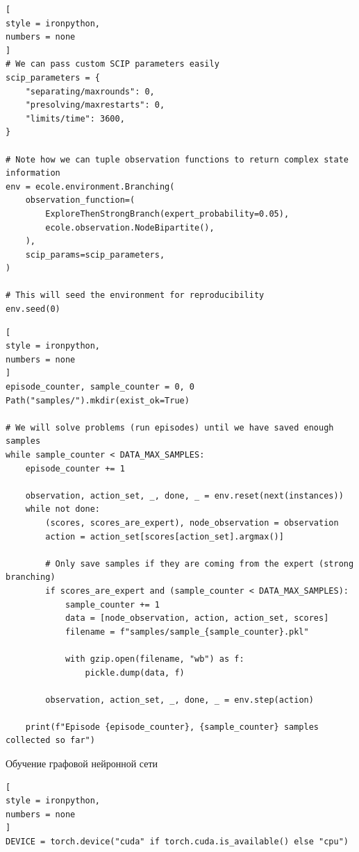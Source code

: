 \documentclass[%
	11pt,
	a4paper,
	utf8,
		]{article}
\begin{document}
\begin{lstlisting}[
style = ironpython,
numbers = none
]
# We can pass custom SCIP parameters easily
scip_parameters = {
	"separating/maxrounds": 0,
	"presolving/maxrestarts": 0,
	"limits/time": 3600,
}

# Note how we can tuple observation functions to return complex state information
env = ecole.environment.Branching(
	observation_function=(
		ExploreThenStrongBranch(expert_probability=0.05),
		ecole.observation.NodeBipartite(),
	),
	scip_params=scip_parameters,
)

# This will seed the environment for reproducibility
env.seed(0)
\end{lstlisting}

\begin{lstlisting}[
style = ironpython,
numbers = none
]
episode_counter, sample_counter = 0, 0
Path("samples/").mkdir(exist_ok=True)

# We will solve problems (run episodes) until we have saved enough samples
while sample_counter < DATA_MAX_SAMPLES:
	episode_counter += 1

	observation, action_set, _, done, _ = env.reset(next(instances))
	while not done:
		(scores, scores_are_expert), node_observation = observation
		action = action_set[scores[action_set].argmax()]

		# Only save samples if they are coming from the expert (strong branching)
		if scores_are_expert and (sample_counter < DATA_MAX_SAMPLES):
			sample_counter += 1
			data = [node_observation, action, action_set, scores]
			filename = f"samples/sample_{sample_counter}.pkl"

			with gzip.open(filename, "wb") as f:
				pickle.dump(data, f)

		observation, action_set, _, done, _ = env.step(action)

	print(f"Episode {episode_counter}, {sample_counter} samples collected so far")
\end{lstlisting}

Обучение графовой нейронной сети
\begin{lstlisting}[
style = ironpython,
numbers = none
]
DEVICE = torch.device("cuda" if torch.cuda.is_available() else "cpu")
\end{lstlisting}
\end{document}
